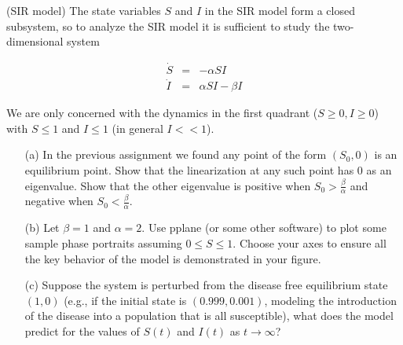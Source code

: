 \documentclass[11pt,letterpaper,boxed]{pset}
\begin{document}
    
    \begin{problem} [Exercise 3.]
        (SIR model) The state variables  $S$ and $I$  in the SIR model form a closed subsystem, so to analyze the SIR model it is sufficient to study the two-dimensional system
        
        \begin{eqnarray}
            \label{s}
            \dot{S} & = & -\alpha S I \\
            \label{i}
            \dot{I} & = & \alpha S I - \beta I 
        \end{eqnarray}
        
        We are only concerned with the dynamics  in the first quadrant ($S \geq 0, I \geq 0$) with $S \leq 1$ and $I \leq 1$ (in general $I << 1$). 
        
        \begin{enumerate}
            \item[(a)] In the previous assignment we found any point of the form $(S_0,0)$ is an equilibrium point. Show that the linearization at any such point has $0$ as an eigenvalue.  Show that the other eigenvalue is positive when $S_0 > \frac{\beta}{\alpha}$ and negative when $S_0 < \frac{\beta}{\alpha}$.  
            \item[(b)] Let $\beta =1$ and $\alpha = 2$. Use pplane (or some other software) to plot some sample  phase portraits  assuming $0 \leq S \leq 1$. Choose your axes to ensure all the key behavior of the model is demonstrated in your figure. 
            \item[(c)] Suppose the system is perturbed from the disease free equilibrium state $(1,0)$ (e.g., if the initial state is $(0.999,0.001)$, modeling the introduction of the disease into a population that is all susceptible), what does the model predict for the values of $S(t)$ and $I(t)$ as $t \to \infty$? 
        \end{enumerate}
    \end{problem}
    \newpage
    
\end{document}
